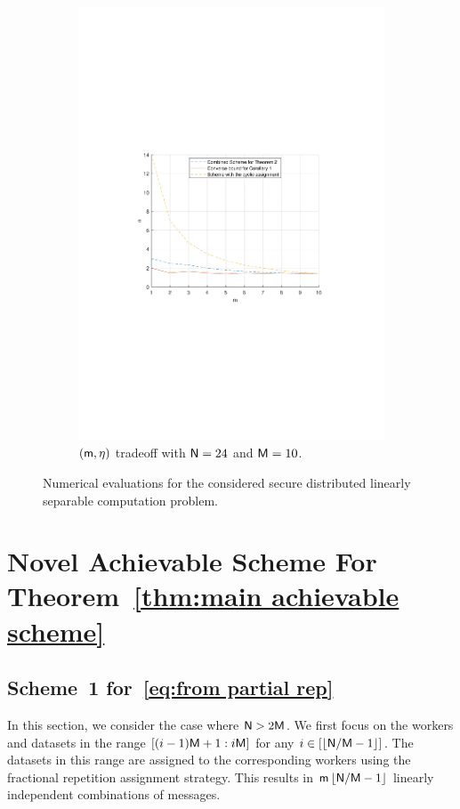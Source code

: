 \documentclass[conference,letterpaper]{IEEEtran}
\begin{document}
\begin{figure}[ht]
\begin{subfigure}[t]{0.5\textwidth}
        \includegraphics[scale=0.5]{m varies.pdf}
        \caption{\small $({\sf m},\eta)$ tradeoff with ${\sf N}=24$ and ${\sf M}=10$.}
        \label{fig:numerical 1c}
    \end{subfigure}
    \caption{\small Numerical evaluations for the considered secure distributed linearly separable computation problem.}
    \label{fig:numerical 1}
\end{figure}


\section{Novel Achievable Scheme For Theorem~\ref{thm:main achievable scheme}}
\label{sec:Achievable coding scheme}


\subsection{\texorpdfstring{Scheme~1 for~\eqref{eq:from partial rep}}{Scheme 1 for Eq. (X)}}
\label{sub:partial rep}
In this section, we consider the case where ${\sf N} > 2{\sf M}$. We first focus on the workers and datasets in the range $[(i-1){\sf M}+1: i{\sf M}]$ for any $i \in \left[\left\lfloor {\sf N}/{\sf M} -1 \right\rfloor\right]$. The datasets in this range are assigned to the corresponding workers using the fractional repetition assignment strategy. This results in ${\sf m} \left\lfloor {\sf N}/{\sf M} -1 \right\rfloor$ linearly independent combinations of messages.
\end{document}

